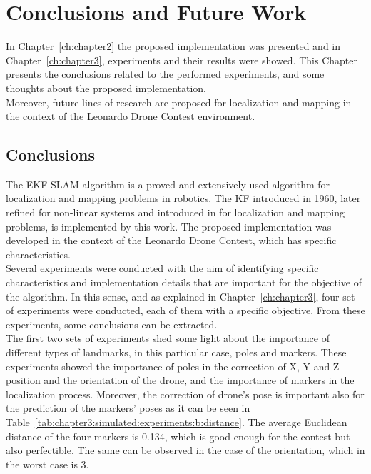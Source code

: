 \chapter{Conclusions and Future Work}
\label{ch:chapter4}
In Chapter~\ref{ch:chapter2} the proposed implementation was presented and in Chapter~\ref{ch:chapter3}, experiments and their results were showed. This Chapter presents the conclusions related to the performed experiments, and some thoughts about the proposed implementation.\\

Moreover, future lines of research are proposed for localization and mapping in the context of the Leonardo Drone Contest environment.

\section{Conclusions}
The EKF-SLAM algorithm is a proved and extensively used algorithm for localization and mapping problems in robotics. The \ac{KF} introduced in 1960, later refined for non-linear systems and introduced in \cite{ekf-slam-smith} for localization and mapping problems, is implemented by this work. The proposed implementation was developed in the context of the Leonardo Drone Contest, which has specific characteristics.\\

Several experiments were conducted with the aim of identifying specific characteristics and implementation details that are important for the objective of the algorithm. In this sense, and as explained in Chapter~\ref{ch:chapter3}, four set of experiments were conducted, each of them with a specific objective. From these experiments, some conclusions can be extracted.\\

The first two sets of experiments shed some light about the importance of different types of landmarks, in this particular case, poles and markers. These experiments showed the importance of poles in the correction of X, Y and Z position and the orientation of the drone, and the importance of markers in the localization process. Moreover, the correction of drone's pose is important also for the prediction of the markers' poses as it can be seen in Table~\ref{tab:chapter3:simulated:experiments:b:distance}. The average Euclidean distance of the four markers is 0.134, which is good enough for the contest but also perfectible. The same can be observed in the case of the orientation, which in the worst case is 3\textdegree.\\

